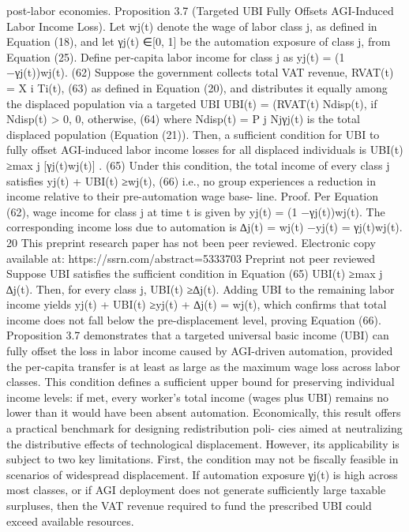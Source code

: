post-labor economies.
Proposition 3.7 (Targeted UBI Fully Offsets AGI-Induced Labor Income Loss). Let wj(t)
denote the wage of labor class j, as defined in Equation (18), and let γj(t) ∈[0, 1] be the
automation exposure of class j, from Equation (25). Define per-capita labor income for class
j as
yj(t) = (1 −γj(t))wj(t).
(62)
Suppose the government collects total VAT revenue,
RVAT(t) =
X
i
Ti(t),
(63)
as defined in Equation (20), and distributes it equally among the displaced population via a
targeted UBI
UBI(t) =
(RVAT(t)
Ndisp(t),
if Ndisp(t) > 0,
0,
otherwise,
(64)
where Ndisp(t) = P
j Njγj(t) is the total displaced population (Equation (21)).
Then, a sufficient condition for UBI to fully offset AGI-induced labor income losses for
all displaced individuals is
UBI(t) ≥max
j
[γj(t)wj(t)] .
(65)
Under this condition, the total income of every class j satisfies
yj(t) + UBI(t) ≥wj(t),
(66)
i.e., no group experiences a reduction in income relative to their pre-automation wage base-
line.
Proof. Per Equation (62), wage income for class j at time t is given by
yj(t) = (1 −γj(t))wj(t).
The corresponding income loss due to automation is
∆j(t) = wj(t) −yj(t) = γj(t)wj(t).
20
This preprint research paper has not been peer reviewed. Electronic copy available at: https://ssrn.com/abstract=5333703
Preprint not peer reviewed
Suppose UBI satisfies the sufficient condition in Equation (65)
UBI(t) ≥max
j
∆j(t).
Then, for every class j,
UBI(t) ≥∆j(t).
Adding UBI to the remaining labor income yields
yj(t) + UBI(t) ≥yj(t) + ∆j(t) = wj(t),
which confirms that total income does not fall below the pre-displacement level, proving
Equation (66).
Proposition 3.7 demonstrates that a targeted universal basic income (UBI) can fully offset
the loss in labor income caused by AGI-driven automation, provided the per-capita transfer
is at least as large as the maximum wage loss across labor classes. This condition defines a
sufficient upper bound for preserving individual income levels: if met, every worker’s total
income (wages plus UBI) remains no lower than it would have been absent automation.
Economically, this result offers a practical benchmark for designing redistribution poli-
cies aimed at neutralizing the distributive effects of technological displacement. However,
its applicability is subject to two key limitations. First, the condition may not be fiscally
feasible in scenarios of widespread displacement. If automation exposure γj(t) is high across
most classes, or if AGI deployment does not generate sufficiently large taxable surpluses,
then the VAT revenue required to fund the prescribed UBI could exceed available resources.
